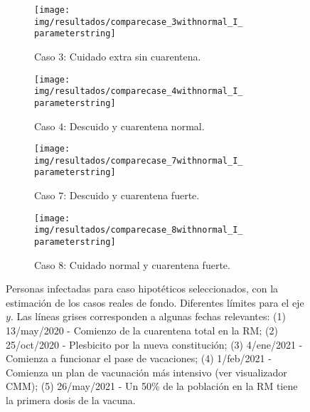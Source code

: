 \begin{figure}
     \centering
     \begin{subfigure}[b]{.47\textwidth}
         \centering
         \texttt{[image: img/resultados/comparecase\_3withnormal\_I\_\\parameterstring]}
         \caption{Caso \(3\): Cuidado extra sin cuarentena.}
     \end{subfigure}
     \hfill
     \begin{subfigure}[b]{.47\textwidth}
         \centering
         \texttt{[image: img/resultados/comparecase\_4withnormal\_I\_\\parameterstring]}
         \caption{Caso \(4\): Descuido y cuarentena normal.}
     \end{subfigure}
     \hfill
     \begin{subfigure}[b]{.47\textwidth}
         \centering
         \texttt{[image: img/resultados/comparecase\_7withnormal\_I\_\\parameterstring]}
         \caption{Caso \(7\): Descuido y cuarentena fuerte.}
     \end{subfigure}
     \hfill
     \begin{subfigure}[b]{.47\textwidth}
         \centering
         \texttt{[image: img/resultados/comparecase\_8withnormal\_I\_\\parameterstring]}
         \caption{Caso \(8\): Cuidado normal y cuarentena fuerte.}
     \end{subfigure}
        \caption[Personas infectadas para caso hipotéticos seleccionados.]{Personas infectadas para caso hipotéticos seleccionados, con la estimación de los casos reales de fondo. Diferentes límites para el eje \(y\). Las líneas grises corresponden a algunas fechas relevantes: (1) 13/may/2020 - Comienzo de la cuarentena total en la RM; (2) 25/oct/2020 - Plesbicito por la nueva constitución; (3) 4/ene/2021 - Comienza a funcionar el pase de vacaciones; (4) 1/feb/2021 - Comienza un plan de vacunación más intensivo (ver visualizador CMM); (5) 26/may/2021 - Un 50\% de la población en la RM tiene la primera dosis de la vacuna.}
        \label{img:hip-3478-I-comp}
\end{figure}

